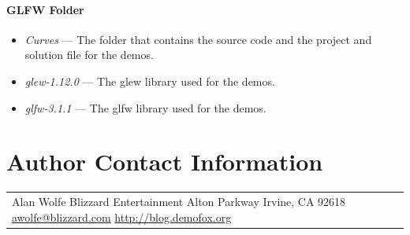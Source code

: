 \documentclass{jcgt}
\begin{document}
\paragraph{\textbf{GLFW Folder}}
\begin{itemize}
  \item \textit{Curves} --- The folder that contains the source code and the project and solution file for the demos.
  \item \textit{glew-1.12.0} --- The glew library used for the demos.
  \item \textit{glfw-3.1.1} --- The glfw library used for the demos.  
\end{itemize}

\section*{Author Contact Information}

\hspace{-2mm}\begin{tabular}{p{}p{}}
Alan Wolfe \newline
Blizzard Entertainment \newline
16215 Alton Parkway \newline
Irvine, CA 92618 \newline
\href{mailto:awolfe@blizzard.com}{awolfe@blizzard.com}
\href{http://blog.demofox.org}{http://blog.demofox.org}
\end{tabular}


\afterdoc
\end{document}
